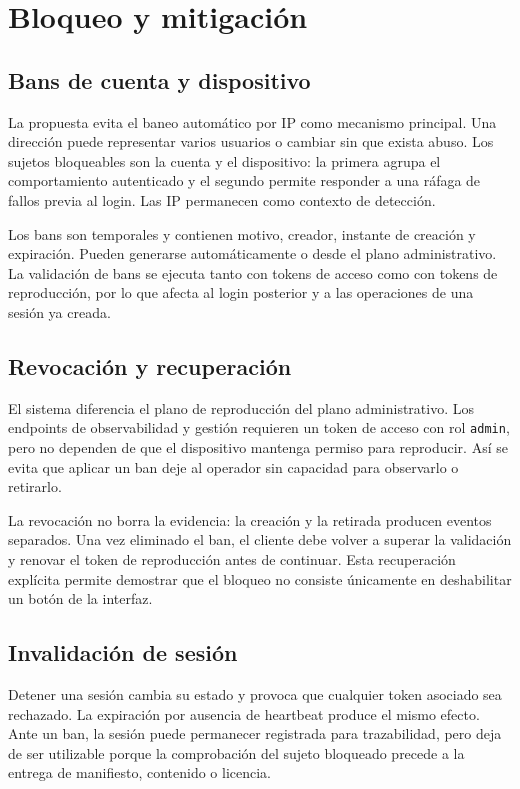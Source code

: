\section{Bloqueo y mitigación}

\subsection{Bans de cuenta y dispositivo}

La propuesta evita el baneo automático por IP como mecanismo principal. Una dirección puede representar varios usuarios o cambiar sin que exista abuso. Los sujetos bloqueables son la cuenta y el dispositivo: la primera agrupa el comportamiento autenticado y el segundo permite responder a una ráfaga de fallos previa al login. Las IP permanecen como contexto de detección.

Los bans son temporales y contienen motivo, creador, instante de creación y expiración. Pueden generarse automáticamente o desde el plano administrativo. La validación de bans se ejecuta tanto con tokens de acceso como con tokens de reproducción, por lo que afecta al login posterior y a las operaciones de una sesión ya creada.

\subsection{Revocación y recuperación}

El sistema diferencia el plano de reproducción del plano administrativo. Los endpoints de observabilidad y gestión requieren un token de acceso con rol \nolinkurl{admin}, pero no dependen de que el dispositivo mantenga permiso para reproducir. Así se evita que aplicar un ban deje al operador sin capacidad para observarlo o retirarlo.

La revocación no borra la evidencia: la creación y la retirada producen eventos separados. Una vez eliminado el ban, el cliente debe volver a superar la validación y renovar el token de reproducción antes de continuar. Esta recuperación explícita permite demostrar que el bloqueo no consiste únicamente en deshabilitar un botón de la interfaz.

\subsection{Invalidación de sesión}

Detener una sesión cambia su estado y provoca que cualquier token asociado sea rechazado. La expiración por ausencia de heartbeat produce el mismo efecto. Ante un ban, la sesión puede permanecer registrada para trazabilidad, pero deja de ser utilizable porque la comprobación del sujeto bloqueado precede a la entrega de manifiesto, contenido o licencia.

